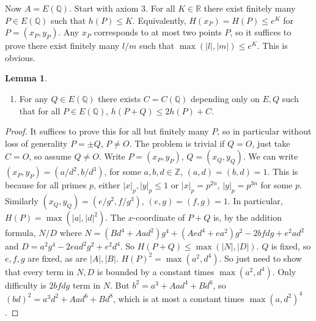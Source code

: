 \documentclass{article}
\newcommand{\Z}{\mathbb{Z}}
\newcommand{\Q}{\mathbb{Q}}
\newcommand{\R}{\mathbb{R}}
\newcommand{\rb}[1]{\left( #1 \right)}
\newcommand{\abs}[1]{\left\lvert #1 \right\rvert}
\theoremstyle{definition}\newtheorem{definition}{Definition}[section]
\theoremstyle{definition}\newtheorem{remark}[definition]{Remark}
\theoremstyle{definition}\newtheorem*{example}{Example}
\theoremstyle{definition}\newtheorem*{note}{Note}
\newtheorem{lemma}[definition]{Lemma}
\begin{document}
Now $ A = E\rb{\Q} $. Start with axiom $ 3 $. For all $ K \in \R $ there exist finitely many $ P \in E\rb{\Q} $ such that $ h\rb{P} \le K $. Equivalently, $ H\rb{x_P} = H\rb{P} \le e^K $ for $ P = \rb{x_P, y_P} $. Any $ x_P $ corresponds to at most two points $ P $, so it suffices to prove there exist finitely many $ l / m $ such that $ \max\rb{\abs{l}, \abs{m}} \le e^K $. This is obvious.

\begin{lemma}
\hfill
\begin{enumerate}
\item For any $ Q \in E\rb{\Q} $ there exists $ C = C\rb{\Q} $ depending only on $ E, Q $ such that for all $ P \in E\rb{\Q} $, $ h\rb{P + Q} \le 2h\rb{P} + C $.
\end{enumerate}
\end{lemma}

\begin{proof}
It suffices to prove this for all but finitely many $ P $, so in particular without loss of generality $ P = \pm Q $, $ P \ne O $. The problem is trivial if $ Q = O $, just take $ C = O $, so assume $ Q \ne O $. Write $ P = \rb{x_P, y_P} $, $ Q = \rb{x_Q, y_Q} $. We can write $ \rb{x_P, y_P} = \rb{a / d^2, b / d^3} $, for some $ a, b, d \in \Z $, $ \rb{a, d} = \rb{b, d} = 1 $. This is because for all primes $ p $, either $ \abs{x}_p, \abs{y}_p \le 1 $ or $ \abs{x}_p = p^{2n} $, $ \abs{y}_p = p^{3n} $ for some $ p $. Similarly $ \rb{x_Q, y_Q} = \rb{e / g^2, f / g^3} $, $ \rb{e, g} = \rb{f, g} = 1 $. In particular, $ H\rb{P} = \max\rb{\abs{a}, \abs{d}^2} $. The $ x $-coordinate of $ P + Q $ is, by the addition formula, $ N / D $ where $ N = \rb{Bd^4 + Aad^2}g^4 + \rb{Aed^4 + ea^2}g^2 - 2bfdg + e^2ad^2 $ and $ D = a^2g^4 - 2ead^2g^2 + e^2d^4 $. So $ H\rb{P + Q} \le \max\rb{\abs{N}, \abs{D}} $. $ Q $ is fixed, so $ e, f, g $ are fixed, as are $ \abs{A}, \abs{B} $. $ H\rb{P}^2 = \max\rb{a^2, d^4} $. So just need to show that every term in $ N, D $ is bounded by a constant times $ \max\rb{a^2, d^4} $. Only difficulty is $ 2bfdg $ term in $ N $. But $ b^2 = a^3 + Aad^4 + Bd^6 $, so $ \rb{bd}^2 = a^3d^2 + Aad^6 + Bd^8 $, which is at most a constant times $ \max\rb{a, d^2}^4 $.
\end{proof}

\end{document}
